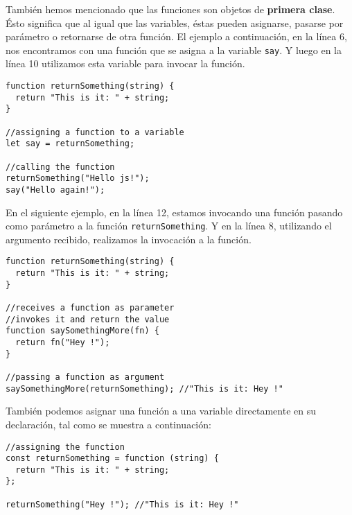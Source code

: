 \documentclass[a4paper, oneside, titlepage, 12pt]{paper}
\begin{document}
También hemos mencionado que las funciones son objetos de \textbf{primera clase}. Ésto significa que al igual que las variables, éstas pueden asignarse, pasarse por parámetro o retornarse de otra función. El ejemplo a continuación, en la línea 6, nos encontramos con una función que se asigna a la variable \colorbox{verylight}{\lstinline{say}}. Y luego en la línea 10 utilizamos esta variable para invocar la función.

\begin{verbatim}
function returnSomething(string) {
  return "This is it: " + string;
}

//assigning a function to a variable
let say = returnSomething;

//calling the function
returnSomething("Hello js!");
say("Hello again!");
\end{verbatim}

En el siguiente ejemplo, en la línea 12, estamos invocando una función pasando como parámetro a la función \texttt{returnSomething}. Y en la línea 8, utilizando el argumento recibido, realizamos la invocación a la función.

\begin{verbatim}
function returnSomething(string) {
  return "This is it: " + string;
}

//receives a function as parameter
//invokes it and return the value
function saySomethingMore(fn) {
  return fn("Hey !");
}

//passing a function as argument
saySomethingMore(returnSomething); //"This is it: Hey !"
\end{verbatim}

También podemos asignar una función a una variable directamente en su declaración, tal como se muestra a continuación:

\begin{verbatim}
//assigning the function
const returnSomething = function (string) {
  return "This is it: " + string;
};

returnSomething("Hey !"); //"This is it: Hey !"
\end{verbatim}
\end{document}
